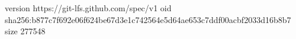 version https://git-lfs.github.com/spec/v1
oid sha256:b877c7f692e06f624be67d3e1c742564e5d64ae653c7ddf00acbf2033d16b8b7
size 277548
